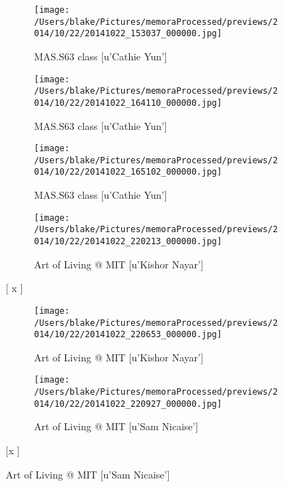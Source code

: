 \documentclass{article}
\begin{document}
\begin{figure}
\centering

\begin{subfigure}{.25\textwidth}\centering\texttt{[image: /Users/blake/Pictures/memoraProcessed/previews/2014/10/22/20141022\_153037\_000000.jpg]}\caption{MAS.S63 class
[u'Cathie Yun']}\end{subfigure}
\begin{subfigure}{.25\textwidth}\centering\texttt{[image: /Users/blake/Pictures/memoraProcessed/previews/2014/10/22/20141022\_164110\_000000.jpg]}\caption{MAS.S63 class
[u'Cathie Yun']}\end{subfigure}
\begin{subfigure}{.25\textwidth}\centering\texttt{[image: /Users/blake/Pictures/memoraProcessed/previews/2014/10/22/20141022\_165102\_000000.jpg]}\caption{MAS.S63 class
[u'Cathie Yun']}\end{subfigure}


\begin{subfigure}{.25\textwidth}\centering\texttt{[image: /Users/blake/Pictures/memoraProcessed/previews/2014/10/22/20141022\_220213\_000000.jpg]}\caption{Art of Living @ MIT
[u'Kishor Nayar']}\end{subfigure}
[ x                                                                    ]


\begin{subfigure}{.25\textwidth}\centering\texttt{[image: /Users/blake/Pictures/memoraProcessed/previews/2014/10/22/20141022\_220653\_000000.jpg]}\caption{Art of Living @ MIT
[u'Kishor Nayar']}\end{subfigure}
\begin{subfigure}{.25\textwidth}\centering\texttt{[image: /Users/blake/Pictures/memoraProcessed/previews/2014/10/22/20141022\_220927\_000000.jpg]}\caption{Art of Living @ MIT
[u'Sam Nicaise']}\end{subfigure}
[x                                                                     ]



\end{figure}
\end{document}
